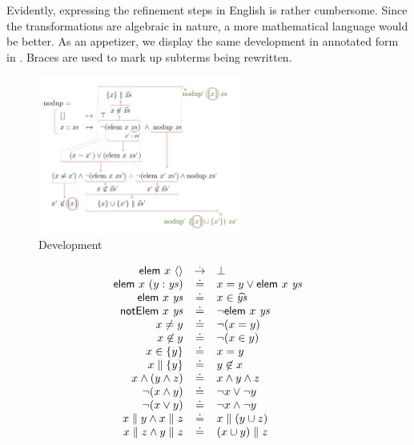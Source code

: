 \bigskip
Evidently, expressing the refinement steps in English is rather cumbersome.
Since the transformations are algebraic in nature, a more mathematical
language would be better.
As an appetizer, we display the same development in annotated form in
.
Braces are used to mark up subterms being rewritten.

\begin{figure}[b]
\includegraphics[width=0.6\textwidth]{gfx/nodup-1-placeholder}
\caption{\label{nodups:proof-sketch-1} Development}
\end{figure}

\begin{table}
\[\begin{array}{rcl}
    \mathsf{elem}~x~\langle\rangle       & \overset{.}{\to} &  \bot                   \\
    \mathsf{elem}~x~(y:\mathit{ys})     & \doteq &  x=y \lor \mathsf{elem}~x~\mathit{ys}   \\
    \mathsf{elem}~x~\mathit{ys}         & \doteq &  x \in \widehat{\mathit{ys}}    \\
    \mathsf{notElem}~x~\mathit{ys}      & \doteq &  \lnot \mathsf{elem}~x~\mathit{ys}      \\
    x\neq y             & \doteq &  \lnot(x = y)           \\
    x\not\in y          & \doteq &  \lnot(x \in y)         \\
    x \in \{y\}         & \doteq &  x = y                  \\
    x \parallel \{y\}   & \doteq &  y \not\in x            \\
    x \land (y\land z)  & \doteq &  x\land y\land z        \\
    \lnot(x\land y)     & \doteq &  \lnot x \lor \lnot y   \\
    \lnot(x\lor y)      & \doteq &  \lnot x \land \lnot y  \\
    x\parallel y \land
    x\parallel z        & \doteq &  x \parallel (y\cup z)  \\
    x\parallel z \land
    y\parallel z        & \doteq &  (x\cup y) \parallel z  \\
  \end{array}\]
\caption{\label{basic-rules}}
\end{table}
